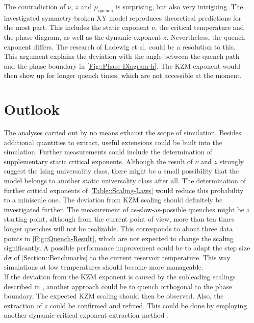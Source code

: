 	The contradiction of $\nu$, $z$ and $\mu_{\text{quench}}$ is surprising, but also very intriguing. The investigated symmetry-broken XY model reproduces theoretical predictions for the most part. This includes the static exponent $\nu$, the critical temperature and the phase diagram, as well as the dynamic exponent $z$. Nevertheless, the quench exponent differs. The research of Ladewig et al. \cite{ladewig2020kibble} could be a resolution to this. This argument explains the deviation with the angle between the quench path and the phase boundary in \autoref{Fig::Phase-Diagram-h}. The KZM exponent would then show up for longer quench times, which are not accessible at the moment.
	\section{Outlook}
	The analyses carried out by no means exhaust the scope of simulation.	Besides additional quantities to extract, useful extensions could be built into the simulation. Further measurements could include the determination of supplementary static critical exponents. Although the result of $\nu$ and $z$ strongly suggest the Ising universality class, there might be a small possibility that the model belongs to another static universality class after all. The determination of further critical exponents of \autoref{Table::Scaling-Laws} would reduce this probability to a miniscule one. The deviation from KZM	scaling should definitely be investigated further. The measurement of as-slow-as-possible quenches might be a starting point, although from the current point of view, more than ten times longer quenches will not be realizable. This corresponds to about three data points in \autoref{Fig::Quench-Result}, which are not expected to change the scaling significantly. A possible performance improvement could be to adapt the step size $\text{d}\sigma$ of \autoref{Section::Benchmarks} to the current reservoir temperature. This way simulations at low temperatures should become more manageable.\\ 
	
	If the deviation from the KZM	exponent is caused by the subleading scalings described in \cite{ladewig2020kibble}, another approach could be to quench orthogonal to the phase boundary. The expected KZM scaling should then be observed. Also, the extraction of $z$ could be confirmed and refined. This could be done by employing another dynamic critical exponent extraction method \cite{ozeki2007nonequilibrium}. \\
	
